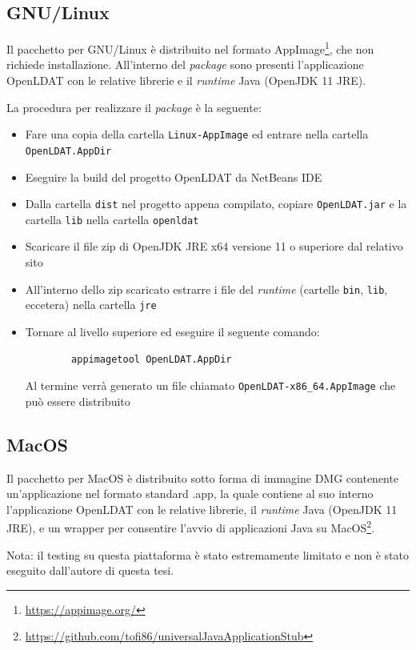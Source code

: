 \subsection{GNU/Linux}
Il pacchetto per GNU/Linux è distribuito nel formato AppImage\footnote{\url{https://appimage.org/}}, che non richiede installazione. All'interno del \textit{package} sono presenti l'applicazione OpenLDAT con le relative librerie e il \textit{runtime} Java (OpenJDK 11 JRE).

La procedura per realizzare il \textit{package} è la seguente:\begin{itemize}
	\item Fare una copia della cartella \texttt{Linux-AppImage} ed entrare nella cartella \texttt{OpenLDAT.AppDir}
	\item Eseguire la build del progetto OpenLDAT da NetBeans IDE
	\item Dalla cartella \texttt{dist} nel progetto appena compilato, copiare \texttt{OpenLDAT.jar} e la cartella \texttt{lib} nella cartella \texttt{openldat}
	\item Scaricare il file zip di OpenJDK JRE x64 versione 11 o superiore dal relativo sito
	\item All'interno dello zip scaricato estrarre i file del \textit{runtime} (cartelle \texttt{bin}, \texttt{lib}, eccetera) nella cartella \texttt{jre}
	\item Tornare al livello superiore ed eseguire il seguente comando:\begin{verbatim}
		appimagetool OpenLDAT.AppDir
	\end{verbatim}
	Al termine verrà generato un file chiamato \texttt{OpenLDAT-x86\_64.AppImage} che può essere distribuito
\end{itemize}

\subsection{MacOS}
Il pacchetto per MacOS è distribuito sotto forma di immagine DMG contenente un'applicazione nel formato standard .app, la quale contiene al suo interno l'applicazione OpenLDAT con le relative librerie, il \textit{runtime} Java (OpenJDK 11 JRE), e un wrapper per consentire l'avvio di applicazioni Java su MacOS\footnote{\url{https://github.com/tofi86/universalJavaApplicationStub}}.

Nota: il testing su questa piattaforma è stato estremamente limitato e non è stato eseguito dall'autore di questa tesi.

